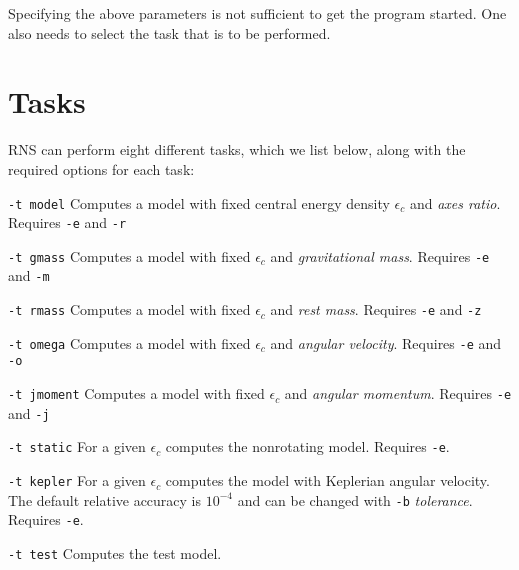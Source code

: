 \vspace{0.3cm}

\<Specifying the above parameters is not sufficient to get the program started.
One also needs to select the task that is to be performed.

\section{Tasks}

RNS can perform eight different tasks, which we list below, along with the
required options for each task:

\begin{description}
 
\item{{\tt -t model}  Computes a model with fixed central energy density 
                     $\epsilon_c$ and {\it axes ratio}. Requires {\tt -e}
                     and {\tt -r}} 

\item{{\tt -t gmass}  Computes a model with fixed $\epsilon_c$ and 
                     {\it gravitational mass}. Requires {\tt -e} and {\tt -m}} 

\item{{\tt -t rmass}  Computes a model with fixed $\epsilon_c$ and 
                     {\it rest mass}. Requires {\tt -e} and {\tt -z}} 

\item{{\tt -t omega}  Computes a model with fixed $\epsilon_c$ and 
                     {\it angular velocity}. Requires {\tt -e} and {\tt -o}} 
 
\item{{\tt -t jmoment}  Computes a model with fixed $\epsilon_c$ and 
                       {\it angular momentum}. Requires {\tt -e} and {\tt -j}} 

\item{{\tt -t static}  For a given $\epsilon_c$ computes the nonrotating model. 
                      Requires {\tt -e}}. 
 
\item{{\tt -t kepler}  For a given $\epsilon_c$ computes the model with 
                      Keplerian angular velocity. The default relative 
                      accuracy is 
                      $10^{-4}$ and can be changed with {\tt -b} {\it 
                      tolerance}. Requires {\tt -e}}. 
  
\item{\tt -t test}  Computes the test model.

\end{description}

